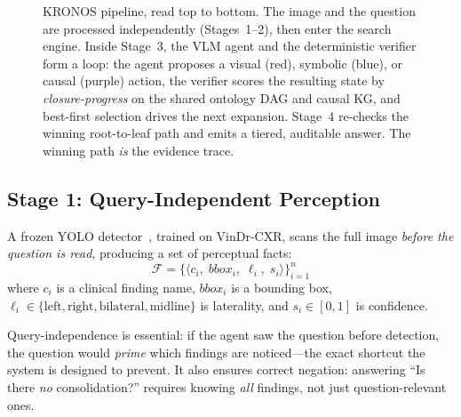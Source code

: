 \documentclass[runningheads]{llncs}
\begin{document}
\begin{figure}[t]
\caption{KRONOS pipeline, read top to bottom. The image and the question
  are processed independently (Stages~1--2), then enter the search engine.
  Inside Stage~3, the VLM agent and the deterministic verifier form a loop:
  the agent proposes a visual (red), symbolic (blue), or causal (purple)
  action, the verifier scores the resulting state by \emph{closure-progress}
  on the shared ontology DAG and causal KG, and best-first selection drives
  the next expansion.
  Stage~4 re-checks the winning root-to-leaf path and emits a tiered,
  auditable answer. The winning path \emph{is} the evidence trace.}
\label{fig:architecture}
\end{figure}


\subsection{Stage 1: Query-Independent Perception}

A frozen YOLO detector~\cite{park2024evax}, trained on VinDr-CXR,
scans the full image \emph{before the question is read}, producing a set
of perceptual facts:
\begin{equation}
  \mathcal{F} = \bigl\{
    \langle c_i,\; \mathit{bbox}_i,\; \ell_i,\; s_i \rangle
  \bigr\}_{i=1}^{n}
  \label{eq:facts}
\end{equation}
where $c_i$ is a clinical finding name, $\mathit{bbox}_i$ is a bounding
box, $\ell_i \in \{\text{left}, \text{right}, \text{bilateral},
\text{midline}\}$ is laterality, and $s_i \in [0,1]$ is confidence.

Query-independence is essential: if the agent saw the question before
detection, the question would \emph{prime} which findings are noticed---the
exact shortcut the system is designed to prevent.
It also ensures correct negation: answering ``Is there \emph{no}
consolidation?'' requires knowing \emph{all} findings, not just
question-relevant ones.
\end{document}
